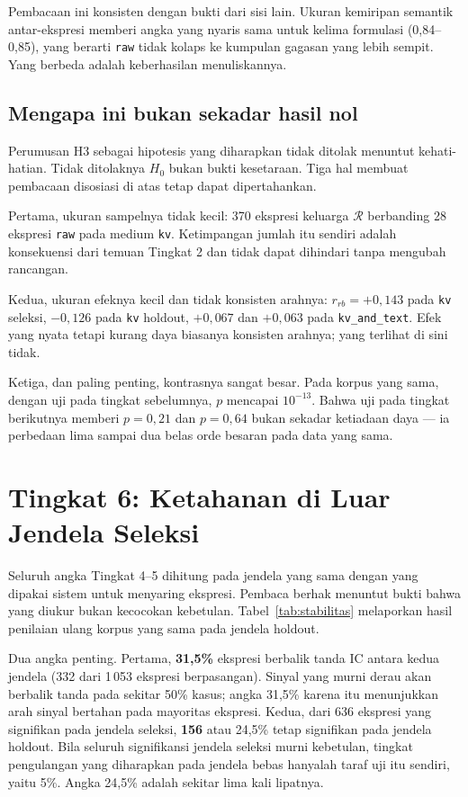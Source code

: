\documentclass{laporanta1statugm}
\newcommand{\code}[1]{\texttt{#1}}
\begin{document}
Pembacaan ini konsisten dengan bukti dari sisi lain. Ukuran kemiripan semantik
antar-ekspresi memberi angka yang nyaris sama untuk kelima formulasi
(0,84--0,85), yang berarti \code{raw} tidak kolaps ke kumpulan gagasan yang
lebih sempit. Yang berbeda adalah keberhasilan menuliskannya.

\subsection{Mengapa ini bukan sekadar hasil nol}

Perumusan H3 sebagai hipotesis yang diharapkan tidak ditolak menuntut
kehati-hatian. Tidak ditolaknya $H_0$ bukan bukti kesetaraan. Tiga hal
membuat pembacaan disosiasi di atas tetap dapat dipertahankan.

Pertama, ukuran sampelnya tidak kecil: 370 ekspresi keluarga $\mathcal{R}$
berbanding 28 ekspresi \code{raw} pada medium \code{kv}. Ketimpangan jumlah itu
sendiri adalah konsekuensi dari temuan Tingkat 2 dan tidak dapat dihindari
tanpa mengubah rancangan.

Kedua, ukuran efeknya kecil dan tidak konsisten arahnya:
$r_{rb} = +0{,}143$ pada \code{kv} seleksi, $-0{,}126$ pada \code{kv} holdout,
$+0{,}067$ dan $+0{,}063$ pada \code{kv\_and\_text}. Efek yang nyata tetapi
kurang daya biasanya konsisten arahnya; yang terlihat di sini tidak.

Ketiga, dan paling penting, kontrasnya sangat besar. Pada korpus yang sama,
dengan uji pada tingkat sebelumnya, $p$ mencapai $10^{-13}$. Bahwa uji pada
tingkat berikutnya memberi $p = 0{,}21$ dan $p = 0{,}64$ bukan sekadar
ketiadaan daya --- ia perbedaan lima sampai dua belas orde besaran pada data
yang sama.

\section{Tingkat 6: Ketahanan di Luar Jendela Seleksi}

Seluruh angka Tingkat 4--5 dihitung pada jendela yang sama dengan yang dipakai
sistem untuk menyaring ekspresi. Pembaca berhak menuntut bukti bahwa yang
diukur bukan kecocokan kebetulan. Tabel~\ref{tab:stabilitas} melaporkan hasil
penilaian ulang korpus yang sama pada jendela holdout.



Dua angka penting. Pertama, \textbf{31,5\%} ekspresi berbalik tanda IC antara
kedua jendela (332 dari 1\,053 ekspresi berpasangan). Sinyal yang murni derau akan berbalik tanda pada sekitar 50\%
kasus; angka 31,5\% karena itu menunjukkan arah sinyal bertahan pada mayoritas
ekspresi. Kedua, dari 636 ekspresi yang signifikan pada jendela seleksi,
\textbf{156} atau 24,5\% tetap signifikan pada jendela holdout. Bila seluruh
signifikansi jendela seleksi murni kebetulan, tingkat pengulangan yang
diharapkan pada jendela bebas hanyalah taraf uji itu sendiri, yaitu 5\%. Angka
24,5\% adalah sekitar lima kali lipatnya.
\end{document}
